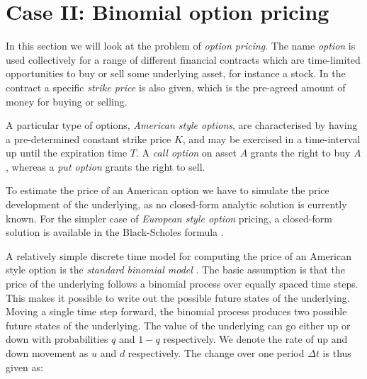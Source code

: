 \documentclass{llncs2e/llncs}
\begin{document}

\section{Case II: Binomial option pricing}
In this section we will look at the problem of \emph{option
  pricing}. The name \emph{option} is used collectively for a range of
different financial contracts which are time-limited opportunities to
buy or sell some underlying asset, for instance a stock. In the
contract a specific \emph{strike price} is also given, which is the
pre-agreed amount of money for buying or selling.

A particular type of options, \emph{American style options}, are
characterised by having a pre-determined constant strike price $K$,
and may be exercised in a time-interval up until the expiration time
$T$. A \emph{call option} on asset $A$ grants the right to buy $A$,
whereas a \emph{put option} grants the right to sell.

To estimate the price of an American option we have to simulate the
price development of the underlying, as no closed-form analytic
solution is currently known. For the simpler case of \emph{European
  style option} pricing, a closed-form solution is available in the
Black-Scholes formula \cite{black1973pricing}.

A relatively simple discrete time model for computing the price of an
American style option is the \emph{standard binomial model}
\cite{cox1979option}.  The basic assumption is that the price of the
underlying follows a binomial process over equally spaced time
steps. This makes it possible to write out the possible future states
of the underlying. Moving a single time step forward, the binomial
process produces two possible future states of the underlying. The
value of the underlying can go either up or down with probabilities
$q$ and $1 - q$ respectively. We denote the rate of up and down
movement as $u$ and $d$ respectively. The change over one period
$\Delta t$ is thus given as:
\end{document}
